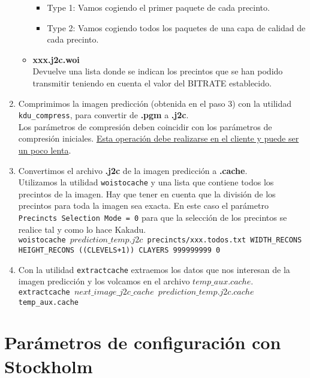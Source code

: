 \documentclass[11pt,a4paper]{article}
\begin{document}
\begin{enumerate}
\begin{itemize}
      \begin{itemize} 
        \item Type 1: Vamos cogiendo el primer paquete de cada precinto.
        \item Type 2: Vamos cogiendo todos los paquetes de una capa de calidad de 
        cada precinto.
      \end{itemize}

      \item \textbf{xxx.j2c.woi} \\ Devuelve una lista donde se indican los
      precintos que se han podido transmitir teniendo en cuenta el valor del BITRATE
      establecido.
    \end{itemize}

  \item Comprimimos la imagen predicci\'{o}n (obtenida en el paso 3) con la
  utilidad \texttt{kdu\_compress}, para convertir de \textbf{.pgm} a
  \textbf{.j2c}. \\ Los par\'{a}metros de compresi\'{o}n deben coincidir
  con los par\'{a}metros de compresi\'{o}n iniciales. \underline{Esta
  operaci\'{o}n debe realizarse en el cliente y puede ser un poco lenta}. \\

  \item Convertimos el archivo \textbf{.j2c} de la imagen predicci\'{o}n a \textbf{.cache}. \\
  Utilizamos la utilidad \texttt{woistocache} y una lista que contiene todos los precintos de la imagen.
  Hay que tener en cuenta que la divisi\'{o}n de los precintos para toda la imagen sea exacta.
  En este caso el par\'{a}metro \texttt{Precincts Selection Mode = 0} para que
  la selecci\'{o}n de los precintos se realice tal y como lo hace Kakadu. \\
  \texttt{woistocache $prediction\_temp.j2c$ precincts/xxx.todos.txt WIDTH\_RECONS \\ 
  HEIGHT\_RECONS ((CLEVELS+1)) CLAYERS 999999999 0}

  \item Con la utilidad \texttt{extractcache} extraemos los datos que nos interesan 
  de la imagen predicci\'{o}n y los volcamos en el archivo $temp\_aux.cache$. \\
  \texttt{extractcache $next\_image\_j2c\_cache$ $prediction\_temp.j2c.cache$ temp\_aux.cache}


\end{enumerate}

\section{Par\'ametros de configuraci\'on con Stockholm}
\end{document}
